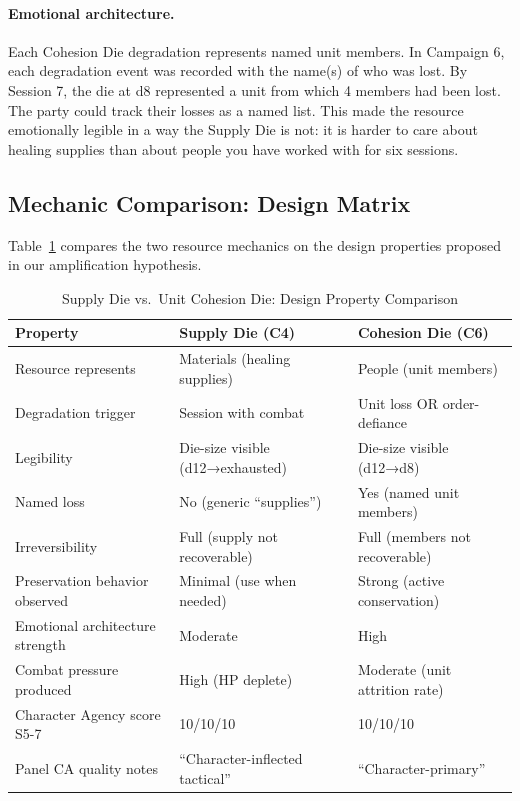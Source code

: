 \paragraph{Emotional architecture.}
Each Cohesion Die degradation represents named unit members. In Campaign 6, each
degradation event was recorded with the name(s) of who was lost. By Session 7, the
die at d8 represented a unit from which 4 members had been lost. The party could
track their losses as a named list. This made the resource emotionally legible in a
way the Supply Die is not: it is harder to care about healing supplies than about
people you have worked with for six sessions.

\subsection{Mechanic Comparison: Design Matrix}

Table~\ref{tab:mechanic-comparison} compares the two resource mechanics on the design
properties proposed in our amplification hypothesis.

\begin{table}[t]
\caption{Supply Die vs.\ Unit Cohesion Die: Design Property Comparison}
\label{tab:mechanic-comparison}
\begin{tabular}{@{}lll@{}}
\toprule
Property & Supply Die (C4) & Cohesion Die (C6) \\
\midrule
Resource represents & Materials (healing supplies) & People (unit members) \\
Degradation trigger & Session with combat & Unit loss OR order-defiance \\
Legibility & Die-size visible (d12→exhausted) & Die-size visible (d12→d8) \\
Named loss & No (generic ``supplies'') & Yes (named unit members) \\
Irreversibility & Full (supply not recoverable) & Full (members not recoverable) \\
Preservation behavior observed & Minimal (use when needed) & Strong (active conservation) \\
Emotional architecture strength & Moderate & High \\
Combat pressure produced & High (HP deplete) & Moderate (unit attrition rate) \\
Character Agency score S5-7 & 10/10/10 & 10/10/10 \\
Panel CA quality notes & ``Character-inflected tactical'' & ``Character-primary'' \\
\bottomrule
\end{tabular}
\end{table}

